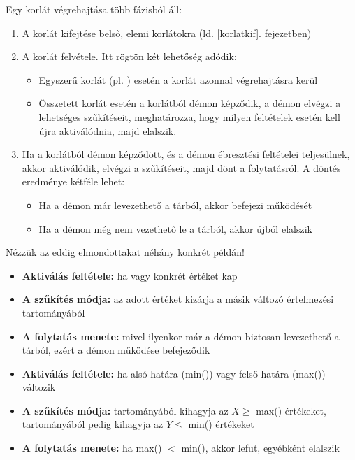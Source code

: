 Egy korlát végrehajtása több fázisból áll:

\begin{enumerate}
\item A korlát kifejtése belső, elemi korlátokra (ld. \ref{korlatkif}. fejezetben)
\item A korlát felvétele. Itt rögtön két lehetőség adódik:

	\begin{itemize}
	\item Egyszerű korlát (pl. ) esetén a korlát azonnal végrehajtásra kerül
	\item Összetett korlát esetén a korlátból démon képződik, a démon elvégzi a
	lehetséges szűkítéseit, meghatározza, hogy milyen feltételek esetén kell újra
	aktiválódnia, majd elalszik.
	\end{itemize}

\item Ha a korlátból démon képződött, és a démon ébresztési feltételei teljesülnek, akkor
aktiválódik, elvégzi a szűkítéseit, majd dönt a folytatásról. A döntés eredménye kétféle
lehet:

	\begin{itemize}
	\item Ha a démon már levezethető a tárból, akkor befejezi működését
	\item Ha a démon még nem vezethető le a tárból, akkor újból elalszik
	\end{itemize}

\end{enumerate}

Nézzük az eddig elmondottakat néhány konkrét példán!

\begin{itemize}
\item {\bf Aktiválás feltétele:} ha  vagy  konkrét értéket kap
\item {\bf A szűkítés módja:} az adott értéket kizárja a másik változó értelmezési
tartományából
\item {\bf A folytatás menete:} mivel ilyenkor már a démon biztosan levezethető
a tárból, ezért a démon működése befejeződik
\end{itemize}

\begin{itemize}
\item {\bf Aktiválás feltétele:} ha  alsó határa (min()) vagy 
felső határa (max()) változik
\item {\bf A szűkítés módja:}  tartományából kihagyja az $X \ge$ max()
értékeket,  tartományából pedig kihagyja az $Y \le$ min() értékeket
\item {\bf A folytatás menete:} ha max() $<$ min(), akkor lefut,
egyébként elalszik
\end{itemize}


